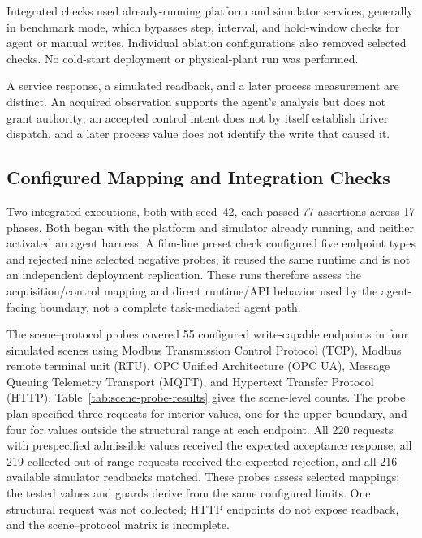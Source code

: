 \documentclass[journal]{IEEEtran}
\begin{document}
Integrated checks used already-running platform and simulator services, generally in benchmark mode, which bypasses step, interval, and hold-window checks for agent or manual writes. Individual ablation configurations also removed selected checks. No cold-start deployment or physical-plant run was performed.

A service response, a simulated readback, and a later process measurement are distinct. An acquired observation supports the agent's analysis but does not grant authority; an accepted control intent does not by itself establish driver dispatch, and a later process value does not identify the write that caused it.

\subsection{Configured Mapping and Integration Checks}
\label{sec:eval-mapping}
Two integrated executions, both with seed~42, each passed 77 assertions across 17 phases. Both began with the platform and simulator already running, and neither activated an agent harness. A film-line preset check configured five endpoint types and rejected nine selected negative probes; it reused the same runtime and is not an independent deployment replication. These runs therefore assess the acquisition/control mapping and direct runtime/API behavior used by the agent-facing boundary, not a complete task-mediated agent path.

The scene--protocol probes covered 55 configured write-capable endpoints in four simulated scenes using Modbus Transmission Control Protocol (TCP), Modbus remote terminal unit (RTU), OPC Unified Architecture (OPC UA), Message Queuing Telemetry Transport (MQTT), and Hypertext Transfer Protocol (HTTP). Table~\ref{tab:scene-probe-results} gives the scene-level counts. The probe plan specified three requests for interior values, one for the upper boundary, and four for values outside the structural range at each endpoint. All 220 requests with prespecified admissible values received the expected acceptance response; all 219 collected out-of-range requests received the expected rejection, and all 216 available simulator readbacks matched. These probes assess selected mappings; the tested values and guards derive from the same configured limits. One structural request was not collected; HTTP endpoints do not expose readback, and the scene--protocol matrix is incomplete.
\end{document}
